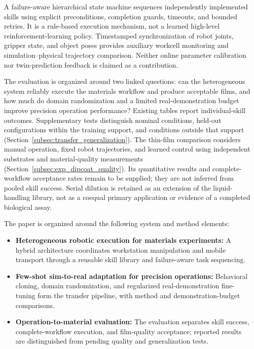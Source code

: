 A failure-aware hierarchical state machine sequences independently implemented skills using explicit preconditions, completion guards, timeouts, and bounded retries. It is a rule-based execution mechanism, not a learned high-level reinforcement-learning policy. Timestamped synchronization of robot joints, gripper state, and object poses provides auxiliary workcell monitoring and simulation--physical trajectory comparison. Neither online parameter calibration nor twin-prediction feedback is claimed as a contribution.

The evaluation is organized around two linked questions: can the heterogeneous system reliably execute the materials workflow and produce acceptable films, and how much do domain randomization and a limited real-demonstration budget improve precision operation performance? Existing tables report individual-skill outcomes. Supplementary tests distinguish nominal conditions, held-out configurations within the training support, and conditions outside that support (Section~\ref{subsec:transfer_generalization}). The thin-film comparison considers manual operation, fixed robot trajectories, and learned control using independent substrates and material-quality measurements (Section~\ref{subsec:exp_dipcoat_quality}). Its quantitative results and complete-workflow acceptance rates remain to be supplied; they are not inferred from pooled skill success. Serial dilution is retained as an extension of the liquid-handling library, not as a coequal primary application or evidence of a completed biological assay.

The paper is organized around the following system and method elements:
\begin{itemize}
    \item \textbf{Heterogeneous robotic execution for materials experiments:} A hybrid architecture coordinates workstation manipulation and mobile transport through a reusable skill library and failure-aware task sequencing.
    \item \textbf{Few-shot sim-to-real adaptation for precision operations:} Behavioral cloning, domain randomization, and regularized real-demonstration fine-tuning form the transfer pipeline, with method and demonstration-budget comparisons.
    \item \textbf{Operation-to-material evaluation:} The evaluation separates skill success, complete-workflow execution, and film-quality acceptance; reported results are distinguished from pending quality and generalization tests.
\end{itemize}
